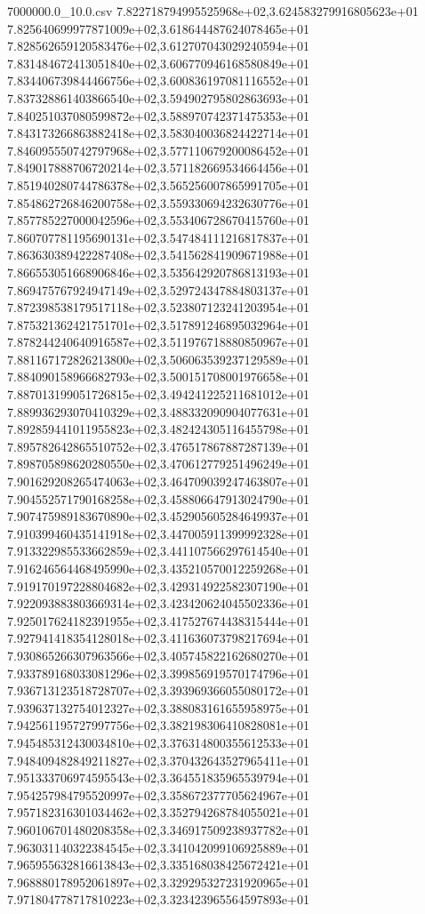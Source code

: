 \begin{filecontents*}{7000000.0_10.0.csv}
7.822718794995525968e+02,3.624583279916805623e+01
7.825640699977871009e+02,3.618644487624078465e+01
7.828562659120583476e+02,3.612707043029240594e+01
7.831484672413051840e+02,3.606770946168580849e+01
7.834406739844466756e+02,3.600836197081116552e+01
7.837328861403866540e+02,3.594902795802863693e+01
7.840251037080599872e+02,3.588970742371475353e+01
7.843173266863882418e+02,3.583040036824422714e+01
7.846095550742797968e+02,3.577110679200086452e+01
7.849017888706720214e+02,3.571182669534664456e+01
7.851940280744786378e+02,3.565256007865991705e+01
7.854862726846200758e+02,3.559330694232630776e+01
7.857785227000042596e+02,3.553406728670415760e+01
7.860707781195690131e+02,3.547484111216817837e+01
7.863630389422287408e+02,3.541562841909671988e+01
7.866553051668906846e+02,3.535642920786813193e+01
7.869475767924947149e+02,3.529724347884803137e+01
7.872398538179517118e+02,3.523807123241203954e+01
7.875321362421751701e+02,3.517891246895032964e+01
7.878244240640916587e+02,3.511976718880850967e+01
7.881167172826213800e+02,3.506063539237129589e+01
7.884090158966682793e+02,3.500151708001976658e+01
7.887013199051726815e+02,3.494241225211681012e+01
7.889936293070410329e+02,3.488332090904077631e+01
7.892859441011955823e+02,3.482424305116455798e+01
7.895782642865510752e+02,3.476517867887287139e+01
7.898705898620280550e+02,3.470612779251496249e+01
7.901629208265474063e+02,3.464709039247463807e+01
7.904552571790168258e+02,3.458806647913024790e+01
7.907475989183670890e+02,3.452905605284649937e+01
7.910399460435141918e+02,3.447005911399992328e+01
7.913322985533662859e+02,3.441107566297614540e+01
7.916246564468495990e+02,3.435210570012259268e+01
7.919170197228804682e+02,3.429314922582307190e+01
7.922093883803669314e+02,3.423420624045502336e+01
7.925017624182391955e+02,3.417527674438315444e+01
7.927941418354128018e+02,3.411636073798217694e+01
7.930865266307963566e+02,3.405745822162680270e+01
7.933789168033081296e+02,3.399856919570174796e+01
7.936713123518728707e+02,3.393969366055080172e+01
7.939637132754012327e+02,3.388083161655958975e+01
7.942561195727997756e+02,3.382198306410828081e+01
7.945485312430034810e+02,3.376314800355612533e+01
7.948409482849211827e+02,3.370432643527965411e+01
7.951333706974595543e+02,3.364551835965539794e+01
7.954257984795520997e+02,3.358672377705624967e+01
7.957182316301034462e+02,3.352794268784055021e+01
7.960106701480208358e+02,3.346917509238937782e+01
7.963031140322384545e+02,3.341042099106925889e+01
7.965955632816613843e+02,3.335168038425672421e+01
7.968880178952061897e+02,3.329295327231920965e+01
7.971804778717810223e+02,3.323423965564597893e+01

\end{filecontents*}
